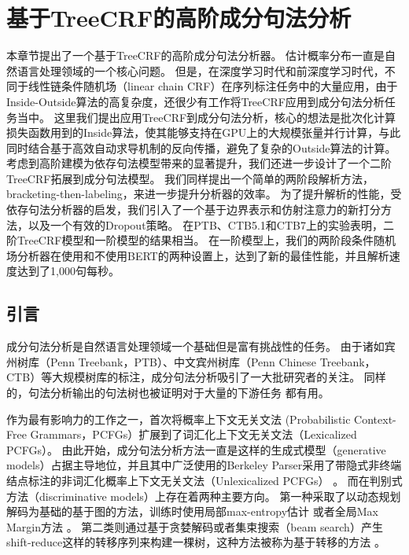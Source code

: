 \chapter{基于TreeCRF的高阶成分句法分析}
\label{cha:con-crf}

本章节提出了一个基于TreeCRF的高阶成分句法分析器。
估计概率分布一直是自然语言处理领域的一个核心问题。
但是，在深度学习时代和前深度学习时代，不同于线性链条件随机场（linear chain CRF）在序列标注任务中的大量应用，由于Inside-Outside算法的高复杂度，还很少有工作将TreeCRF应用到成分句法分析任务当中。
这里我们提出应用TreeCRF到成分句法分析，核心的想法是批次化计算损失函数用到的Inside算法，使其能够支持在GPU上的大规模张量并行计算，与此同时结合基于高效自动求导机制的反向传播，避免了复杂的Outside算法的计算。
考虑到高阶建模为依存句法模型带来的显著提升，我们还进一步设计了一个二阶TreeCRF拓展到成分句法模型。
我们同样提出一个简单的两阶段解析方法，bracketing-then-labeling，来进一步提升分析器的效率。
为了提升解析的性能，受依存句法分析器的启发，我们引入了一个基于边界表示和仿射注意力的新打分方法，以及一个有效的Dropout策略。
在PTB、CTB5.1和CTB7上的实验表明，二阶TreeCRF模型和一阶模型的结果相当。
在一阶模型上，我们的两阶段条件随机场分析器在使用和不使用BERT的两种设置上，达到了新的最佳性能，并且解析速度达到了1,000句每秒。

\section{引言}\label{sec:con-intro}

成分句法分析是自然语言处理领域一个基础但是富有挑战性的任务。
由于诸如宾州树库（Penn Treebank，PTB）、中文宾州树库（Penn Chinese Treebank，CTB）等大规模树库的标注，成分句法分析吸引了一大批研究者的关注。
同样的，句法分析输出的句法树也被证明对于大量的下游任务 \citep{akoury-etal-2019-syntactically,wang-etal-2018-tree}都有用。

作为最有影响力的工作之一，\citet{collins-1997-three}首次将概率上下文无关文法 (Probabilistic Context-Free Grammars，PCFGs）扩展到了词汇化上下文无关文法（Lexicalized PCFGs）。
由此开始，成分句法分析方法一直是这样的生成式模型（generative models）占据主导地位，并且其中广泛使用的Berkeley Parser采用了带隐式非终端结点标注的非词汇化概率上下文无关文法（Unlexicalized PCFGs） \citep{matsuzaki-etal-2005-probabilistic,petrov-klein-2007-improved}。
而在判别式方法（discriminative models）上存在着两种主要方向。
第一种采取了以动态规划解码为基础的基于图的方法，训练时使用局部max-entropy估计 \citep{kaplan-etal-2004-speed}或者全局Max Margin方法 \citep{taskar-etal-2004-max}。
第二类则通过基于贪婪解码或者集束搜索（beam search）产生shift-reduce这样的转移序列来构建一棵树，这种方法被称为基于转移的方法 \citep{sagae-lavie-2005-classifier,zhu-etal-2013-fast}。

